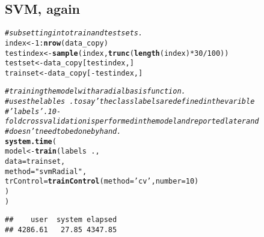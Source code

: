 \documentclass[titlepage]{article}\usepackage[]{graphicx}\usepackage[]{color}
\makeatletter
\newcommand{\hlnum}[1]{\textcolor[rgb]{0.686,0.059,0.569}{#1}}%
\newcommand{\hlstr}[1]{\textcolor[rgb]{0.192,0.494,0.8}{#1}}%
\newcommand{\hlcom}[1]{\textcolor[rgb]{0.678,0.584,0.686}{\textit{#1}}}%
\newcommand{\hlopt}[1]{\textcolor[rgb]{0,0,0}{#1}}%
\newcommand{\hlstd}[1]{\textcolor[rgb]{0.345,0.345,0.345}{#1}}%
\newcommand{\hlkwb}[1]{\textcolor[rgb]{0.69,0.353,0.396}{#1}}%
\newcommand{\hlkwc}[1]{\textcolor[rgb]{0.333,0.667,0.333}{#1}}%
\newcommand{\hlkwd}[1]{\textcolor[rgb]{0.737,0.353,0.396}{\textbf{#1}}}%
\newenvironment{kframe}{%
 \def\at@end@of@kframe{}%
 \ifinner\ifhmode%
  \def\at@end@of@kframe{\end{minipage}}%
  \begin{minipage}{\columnwidth}%
 \fi\fi%
 \def\FrameCommand##1{\hskip\@totalleftmargin \hskip-\fboxsep
 \colorbox{shadecolor}{##1}\hskip-\fboxsep
     \hskip-\linewidth \hskip-\@totalleftmargin \hskip\columnwidth}%
 \MakeFramed {\advance\hsize-\width
   \@totalleftmargin\z@ \linewidth\hsize
   \@setminipage}}%
 {\par\unskip\endMakeFramed%
 \at@end@of@kframe}
\newenvironment{knitrout}{}{} %
\makeatother
\begin{document}
\subsection{SVM, again}
\begin{knitrout}
\color{fgcolor}\begin{kframe}
\begin{alltt}
\hlcom{# subsetting into train and test sets.}
\hlstd{index} \hlkwb{<-} \hlnum{1}\hlopt{:}\hlkwd{nrow}\hlstd{(data_copy)}
\hlstd{testindex} \hlkwb{<-} \hlkwd{sample}\hlstd{(index,} \hlkwd{trunc}\hlstd{(}\hlkwd{length}\hlstd{(index)}\hlopt{*}\hlnum{30}\hlopt{/}\hlnum{100}\hlstd{))}
\hlstd{testset} \hlkwb{<-} \hlstd{data_copy[testindex,]}
\hlstd{trainset} \hlkwb{<-} \hlstd{data_copy[}\hlopt{-}\hlstd{testindex,]}

\hlcom{# training the model with a radial basis function.}
\hlcom{# uses the lables ~ . to say 'the class labels are defined in the varible}
\hlcom{# 'labels'. 10-fold cross validation is performed in the model and reported later and}
\hlcom{# doesn't need to be done by hand.}
\hlkwd{system.time}\hlstd{(}
  \hlstd{model} \hlkwb{<-} \hlkwd{train}\hlstd{(labels} \hlopt{~} \hlstd{.,}
                 \hlkwc{data} \hlstd{= trainset,}
                 \hlkwc{method}\hlstd{=}\hlstr{"svmRadial"}\hlstd{,}
                 \hlkwc{trControl}\hlstd{=}\hlkwd{trainControl}\hlstd{(}\hlkwc{method}\hlstd{=}\hlstr{'cv'}\hlstd{,} \hlkwc{number} \hlstd{=} \hlnum{10}\hlstd{)}
                 \hlstd{)}
\hlstd{)}
\end{alltt}


{\ttfamily\noindent\itshape\color{messagecolor}{\#\# Loading required package: kernlab}}\begin{verbatim}
##    user  system elapsed 
## 4286.61   27.85 4347.85
\end{verbatim}
\end{kframe}
\end{knitrout}
\end{document}
